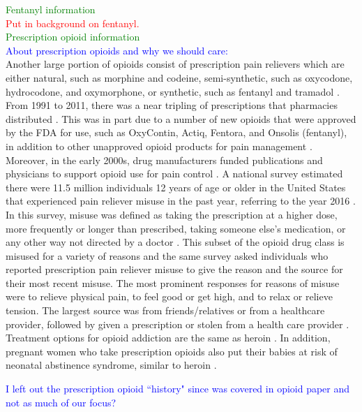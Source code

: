 \documentclass[12pt]{article}
\begin{document}
\textcolor{green}{Fentanyl information} \\
\textcolor{red}{Put in background on fentanyl.} \\

\textcolor{green}{Prescription opioid information} \\
\textcolor{blue}{About prescription opioids and why we should care:} \\
Another large portion of opioids consist of prescription pain relievers which are either natural, such as morphine and codeine, semi-synthetic, such as oxycodone, hydrocodone, and oxymorphone, or synthetic, such as fentanyl and tramadol \cite{CDC3, TNMentalHealth2}. From 1991 to 2011, there was a near tripling of prescriptions that pharmacies distributed \cite{NIDA1}. This was in part due to a number of new opioids that were approved by the FDA for use, such as OxyContin, Actiq, Fentora, and Onsolis (fentanyl), in addition to other unapproved opioid products for pain management \cite{FDA1}. Moreover, in the early 2000s, drug manufacturers funded publications and physicians to support opioid use for pain control \cite{Mandell}. A national survey estimated there were 11.5 million individuals 12 years of age or older in the United States that experienced pain reliever misuse in the past year, referring to the year 2016 \cite{CDC2}. In this survey, misuse was defined as taking the prescription at a higher dose, more frequently or longer than prescribed, taking someone else's medication, or any other way not directed by a doctor \cite{SAMSHA3}. This subset of the opioid drug class is misused for a variety of reasons and the same survey asked individuals who reported prescription pain reliever misuse to give the reason and the source for their most recent misuse. The most prominent responses for reasons of misuse were to relieve physical pain, to feel good or get high, and to relax or relieve tension. The largest source was from friends/relatives or from a healthcare provider, followed by given a prescription or stolen from a health care provider \cite{CDC2}. Treatment options for opioid addiction are the same as heroin \cite{SAMSHA1}. In addition, pregnant women who take prescription opioids also put their babies at risk of neonatal abstinence syndrome, similar to heroin \cite{CDC5}. 

\textcolor{blue}{I left out the prescription opioid ``history" since was covered in opioid paper and not as much of our focus?}
\end{document}
